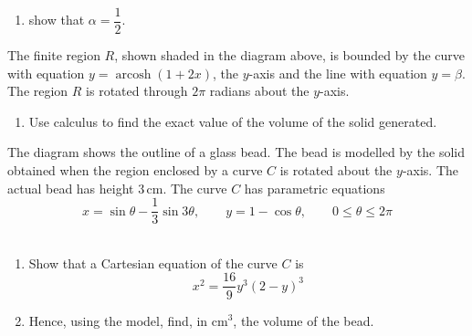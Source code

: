 \documentclass[leqno]{article}
\begin{document}
\begin{enumerate}[
  label=\textbf{\arabic*.},
  leftmargin=*,
  topsep=0pt,
  partopsep=0pt,
  parsep=0pt
]
\begin{enumerate}[label=\textbf{(\alph*)}]
  \item show that $\alpha = \dfrac{1}{2}$.  \\
\end{enumerate}
The finite region $R$, shown shaded in the diagram above, is bounded by the curve with equation $y = \operatorname{arcosh}(1 + 2x)$, the $y$-axis and the line with equation $y = \beta$. \\

  The region $R$ is rotated through $2\pi$ radians about the $y$-axis. \\
\begin{enumerate}[label=\textbf{(\alph*)}, resume]
\item Use calculus to find the exact value of the volume of the solid generated.  \\
\end{enumerate}
\newpage
\questionitem

\begin{figure}[H]
    \centering
{}
\end{figure}


The diagram shows the outline of a glass bead. The bead is modelled by the solid obtained when the region enclosed by a curve $C$ is rotated about the $y$-axis. The actual bead has height $3\,\mathrm{cm}$. The curve $C$ has parametric equations
\[
x = \sin\theta - \frac{1}{3}\sin 3\theta,\qquad y = 1 - \cos\theta,\qquad 0 \le \theta \le 2\pi
\] \\

\begin{enumerate}[label=\textbf{(\alph*)}]
  \item Show that a Cartesian equation of the curve $C$ is
  \[
  x^2 = \frac{16}{9}y^3(2-y)^3
  \]
  \item Hence, using the model, find, in $\mathrm{cm}^3$, the volume of the bead.  \\
\end{enumerate}


\end{enumerate}
\end{document}
